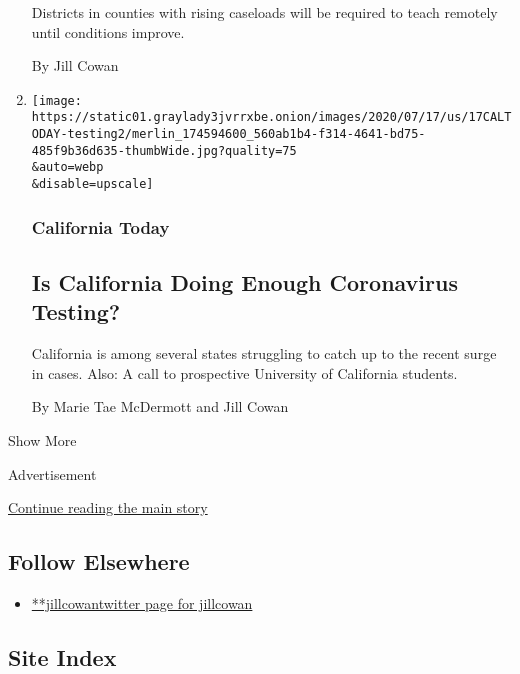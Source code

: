 \begin{enumerate}
  Districts in counties with rising caseloads will be required to teach
  remotely until conditions improve.

  By Jill Cowan
\item
  \href{/2020/07/17/us/ca-coronavirus-covid-testing.html}{}

  \texttt{[image: https://static01.graylady3jvrrxbe.onion/images/2020/07/17/us/17CALTODAY-testing2/merlin\_174594600\_560ab1b4-f314-4641-bd75-485f9b36d635-thumbWide.jpg?quality=75\\\&auto=webp\\\&disable=upscale]}

  \hypertarget{california-today-7}{%
  \subsubsection{California Today}\label{california-today-7}}

  \hypertarget{is-california-doing-enough-coronavirus-testing}{%
  \subsection{Is California Doing Enough Coronavirus
  Testing?}\label{is-california-doing-enough-coronavirus-testing}}

  California is among several states struggling to catch up to the
  recent surge in cases. Also: A call to prospective University of
  California students.

  By Marie Tae McDermott and Jill Cowan
\end{enumerate}

Show More

Advertisement

\protect\hyperlink{after-mid2}{Continue reading the main story}

\hypertarget{follow-elsewhere}{%
\subsection{Follow Elsewhere}\label{follow-elsewhere}}

\begin{itemize}
\tightlist
\item
  \href{https://twitter.com/jillcowan}{**jillcowantwitter page for
  jillcowan}
\end{itemize}

\hypertarget{site-index}{%
\subsection{Site Index}\label{site-index}}

